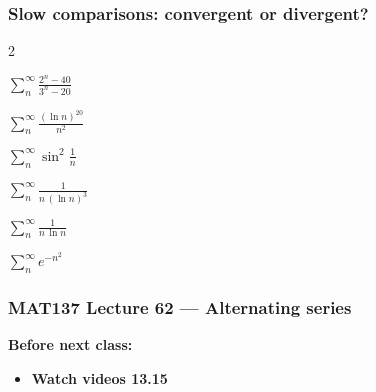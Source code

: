 \documentclass[14pt]{beamer}
\newcommand{\vv}{\vspace{.5cm}}
\begin{document}
	\begin{frame}[t]
		\frametitle{Slow comparisons: convergent or divergent?}

		\begin{enumerate}
		\end{enumerate}
	\end{frame}






\begin{frame}
	\frametitle{MAT137 Lecture 62 ---  	Alternating series }

	\vfill
	{\bf Before next class:}
		\begin{itemize} \normalsize
			\item {\bf Watch videos  	13.15 }
		\end{itemize}
\end{frame}
\end{document}
